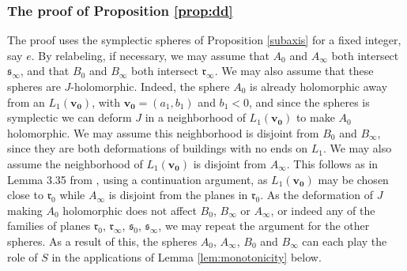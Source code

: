 \documentclass[12pt]{amsart}
\newtheorem{proposition}[theorem]{Proposition}
\theoremstyle{definition}
\begin{document}




\subsubsection{The proof of Proposition \ref{prop:dd}} The proof uses the symplectic spheres of Proposition \ref{subaxis} for a fixed  integer, say  $e$. By relabeling, if necessary, we may assume that $A_0$ and $A_{\infty}$ both intersect $\mathfrak{s}_{\infty}$, and that $B_0$ and $B_{\infty}$ both intersect $\mathfrak{r}_{\infty}$. We may also assume that these spheres are $J$-holomorphic. Indeed, the sphere $A_0$ is already holomorphic away from an $L_1(\mathbf{v_0})$, with $\mathbf{v_0} = (a_1,b_1)$ and $b_1<0$, and since the spheres is symplectic we can deform $J$ in a neighborhood of $L_1(\mathbf{v_0})$ to make $A_0$ holomorphic. We may assume this neighborhood is disjoint from $B_0$ and $B_{\infty}$, since they are both deformations of buildings with no ends on $L_1$. We may also assume the neighborhood of $L_1(\mathbf{v_0})$ is disjoint from $A_{\infty}$. This follows as in Lemma 3.35 from \cite{hiker}, using a continuation argument, as $L_1(\mathbf{v_0})$ may be chosen close to $\mathfrak{r}_0$ while $A_{\infty}$ is disjoint from the planes in $\mathfrak{r}_0$. As the deformation of $J$ making $A_0$ holomorphic does not affect $B_0$, $B_{\infty}$ or $A_{\infty}$, or indeed any of the families of planes $\mathfrak{r}_{0}$, $\mathfrak{r}_{\infty}$, $\mathfrak{s}_{0}$, $\mathfrak{s}_{\infty}$, we may repeat the argument for the other spheres.
As a result of this, the spheres $A_0$, $A_{\infty}$, $B_0$ and $B_{\infty}$ can each play the role of $S$ in the applications of Lemma \ref{lem:monotonicity} below.
\end{document}
